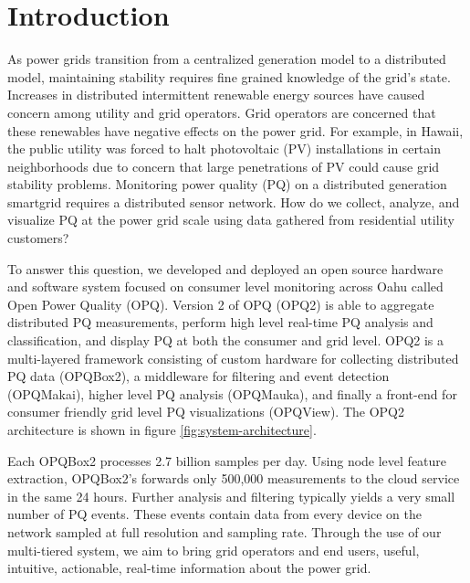 \documentclass[a4paper, conference]{IEEEtran}
\begin{document}
\section{Introduction}
As power grids transition from a centralized generation model to a distributed model, maintaining stability requires fine grained knowledge of the grid's state\cite{ECPAB}. Increases in distributed intermittent renewable energy sources have caused concern among utility and grid operators. Grid operators are concerned that these renewables have negative effects on the power grid. For example, in Hawaii, the public utility was forced to halt photovoltaic (PV) installations in certain neighborhoods due to concern that large penetrations of PV could cause grid stability problems\cite{fares_2015}\cite{mulkern_2013}. Monitoring power quality (PQ) on a distributed generation smartgrid requires a distributed sensor network. How do we collect, analyze, and visualize PQ at the power grid scale using data gathered from residential utility customers? 

To answer this question, we developed and deployed an open source hardware and software system focused on consumer level monitoring across Oahu called Open Power Quality (OPQ). Version 2 of OPQ (OPQ2) is able to aggregate distributed PQ measurements, perform high level real-time PQ analysis and classification, and display PQ at both the consumer and grid level. OPQ2 is a multi-layered framework consisting of custom hardware for collecting distributed PQ data (OPQBox2), a middleware for filtering and event detection (OPQMakai), higher level PQ analysis (OPQMauka), and finally a front-end for consumer friendly grid level PQ visualizations (OPQView). The OPQ2 architecture is shown in figure \ref{fig:system-architecture}.

Each OPQBox2 processes 2.7 billion samples per day. Using node level feature extraction, OPQBox2's forwards only 500,000 measurements to the cloud service in the same 24 hours. Further analysis and filtering typically yields a very small number of PQ events. These events contain data from every device on the network sampled at full resolution and sampling rate.  Through the use of our multi-tiered system, we aim to bring grid operators and end users, useful, intuitive, actionable, real-time information about the power grid.

\end{document}
